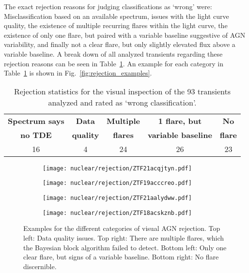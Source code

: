 The exact rejection reasons for judging classifications as `wrong' were: Misclassification based on an available spectrum, issues with the light curve quality, the existence of multiple recurring flares within the light curve, the existence of only one flare, but paired with a variable baseline suggestive of AGN variability, and finally not a clear flare, but only slightly elevated flux above a variable baseline. A break down of all analyzed transients regarding these rejection reasons can be seen in Table~\ref{tab:rejection_statistics}. An example for each category in Table~\ref{tab:rejection_statistics} is shown in Fig.~\ref{fig:rejection_examples}.

\begin{table}
  \centering
  \def\arraystretch{1.2}
  \begin{tabular}{c c  c  c c}
    \hline
    \textbf{Spectrum says} & \textbf{Data}    & \textbf{Multiple} & \textbf{1 flare, but}      & \textbf{No}    \\
    \textbf{no TDE}        & \textbf{quality} & \textbf{flares}   & \textbf{variable baseline} & \textbf{flare} \\
    \hline
    \hline
    16                     & 4                & 24                & 26                         & 23             \\
    \hline
  \end{tabular}
  \caption[Visual inspection: rejection statistics]{Rejection statistics for the visual inspection of the 93 transients analyzed and rated as `wrong classification'.}
  \label{tab:rejection_statistics}
\end{table}

\begin{figure}[htbp]
  \centering
  \begin{subfigure}[htb]{0.48\textwidth}
    \texttt{[image: nuclear/rejection/ZTF21acqjtyn.pdf]}
  \end{subfigure}
  \begin{subfigure}[htb]{0.48\textwidth}
    \texttt{[image: nuclear/rejection/ZTF19acccreo.pdf]}
  \end{subfigure}
  \begin{subfigure}[htb]{0.48\textwidth}
    \texttt{[image: nuclear/rejection/ZTF21aalydww.pdf]}
  \end{subfigure}
  \begin{subfigure}[htb]{0.48\textwidth}
    \texttt{[image: nuclear/rejection/ZTF18acskznb.pdf]}
  \end{subfigure}
  \caption[Examples of visual AGN rejection]{Examples for the different categories of visual AGN rejection. Top left: Data quality issues. Top right: There are multiple flares, which the Bayesian block algorithm failed to detect. Bottom left: Only one clear flare, but signs of a variable baseline. Bottom right: No flare discernible.}
\end{figure}

